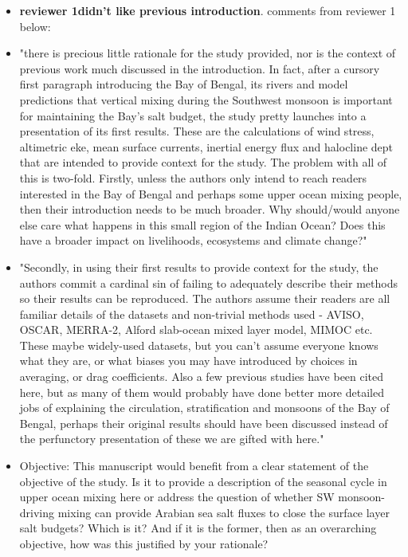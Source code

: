 \documentclass[twocol]{ametsoc}
\begin{document}
\begin{itemize}
\item \textbf{reviewer 1didn't like previous introduction}. comments from reviewer 1 below:
\item "there is precious little rationale for the study provided, nor is the context of previous work much discussed in the introduction.  In fact, after a cursory first paragraph introducing the Bay of Bengal, its rivers and model predictions that vertical mixing during the Southwest monsoon is important for maintaining the Bay's salt budget, the study pretty launches into a presentation of its first results. These are the calculations of wind stress, altimetric eke,  mean surface currents, inertial energy flux and halocline dept that are intended to provide context for the study.  The problem with all of this is two-fold. Firstly, unless the authors only intend to reach readers interested in the Bay of Bengal and perhaps some upper ocean mixing people, then their introduction needs to be much broader.  Why should/would anyone else care what happens in this small region of the Indian Ocean?  Does this have a broader impact on livelihoods, ecosystems and climate change?"
\item "Secondly, in using their first results to provide context for the study, the authors commit a cardinal sin of failing to adequately describe their methods so their results can be reproduced.  The authors assume their readers are all familiar details of the datasets and non-trivial methods used - AVISO, OSCAR, MERRA-2, Alford slab-ocean mixed layer model, MIMOC etc.  These maybe widely-used datasets, but you can't assume everyone knows what they are, or what biases you may have introduced by choices in averaging, or drag coefficients. Also a few previous studies have been cited here, but as many of them would probably have done better more detailed jobs of explaining the circulation, stratification and monsoons of the Bay of Bengal, perhaps their original results should have been discussed instead of the perfunctory presentation of these we are gifted with here."
\item Objective:  This manuscript would benefit from a clear statement of the objective of the study.  Is it to provide a description of the seasonal cycle in upper ocean mixing here or address the question of whether SW monsoon-driving mixing can provide Arabian sea salt fluxes to close the  surface layer salt budgets?  Which is it? And if it is the former, then as an overarching objective, how was this justified by your rationale?
\end{itemize}
\end{document}
